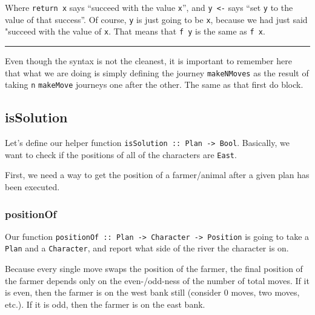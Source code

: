 \documentclass[]{article}
\newenvironment{Shaded}{}{}
\newcommand{\DataTypeTok}[1]{\textcolor[rgb]{0.56,0.13,0.00}{#1}}
\newcommand{\FunctionTok}[1]{\textcolor[rgb]{0.02,0.16,0.49}{#1}}
\newcommand{\KeywordTok}[1]{\textcolor[rgb]{0.00,0.44,0.13}{\textbf{#1}}}
\newcommand{\NormalTok}[1]{#1}
\newcommand{\OtherTok}[1]{\textcolor[rgb]{0.00,0.44,0.13}{#1}}
\begin{document}
Where \texttt{return\ x} says ``succeed with the value \texttt{x}'', and
\texttt{y\ \textless{}-} says ``set \texttt{y} to the value of that success''.
Of course, \texttt{y} is just going to be \texttt{x}, because we had just said
"succeed with the value of \texttt{x}. That means that \texttt{f\ y} is the same
as \texttt{f\ x}.

\begin{center}\rule{0.5\linewidth}{\linethickness}\end{center}

Even though the syntax is not the cleanest, it is important to remember here
that what we are doing is simply defining the journey \texttt{makeNMoves} as the
result of taking \texttt{n} \texttt{makeMove} journeys one after the other. The
same as that first do block.

\hypertarget{issolution}{%
\subsection{isSolution}\label{issolution}}

Let's define our helper function
\texttt{isSolution\ ::\ Plan\ -\textgreater{}\ Bool}. Basically, we want to
check if the positions of all of the characters are \texttt{East}.

First, we need a way to get the position of a farmer/animal after a given plan
has been executed.

\hypertarget{positionof}{%
\subsubsection{positionOf}\label{positionof}}

Our function
\texttt{positionOf\ ::\ Plan\ -\textgreater{}\ Character\ -\textgreater{}\ Position}
is going to take a \texttt{Plan} and a \texttt{Character}, and report what side
of the river the character is on.

Because every single move swaps the position of the farmer, the final position
of the farmer depends only on the even-/odd-ness of the number of total moves.
If it is even, then the farmer is on the west bank still (consider 0 moves, two
moves, etc.). If it is odd, then the farmer is on the east bank.

\begin{Shaded}
\end{Shaded}
\end{document}
